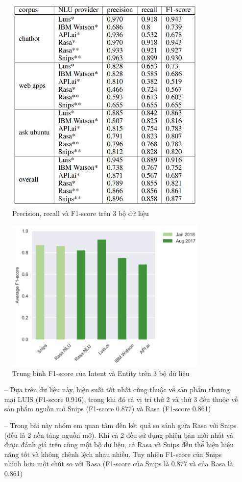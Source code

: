 \begin{figure}[htp]
    \centering
    \includegraphics[width=10cm]{images/comparisonimg/benchmark2017and2018.png}
    \caption{Precision, recall và F1-score trên 3 bộ dữ liệu}
    \label{fig:benchmark2017and2018}
\end{figure}

\begin{figure}[htp]
    \centering
    \includegraphics[width=10cm]{images/comparisonimg/averageF1-scores.png}
    \caption{Trung bình F1-score của Intent và Entity trên 3 bộ dữ liệu}
    \label{fig:averageF1-scores}
\end{figure}

\begin{itemize}
    \item[--] Dựa trên dữ liệu này, hiệu suất tốt nhất cũng thuộc về sản phẩm thương mại LUIS (F1-score 0.916), trong khi đó cả vị trí thứ 2 và thứ 3 đều thuộc về sản phẩm nguồn mở Snips (F1-score 0.877) và Rasa  (F1-score 0.861)
    \item[--] Trong bài này nhóm em quan tâm đến kết quả so sánh giữa Rasa với Snips (đều là 2 nền tảng nguồn mở). Khi cả 2 đều sử dụng phiên bản mới nhất và được đánh giá trên cùng một bộ dữ liệu, cả Rasa và Snips đều thể hiện hiệu năng tốt và không chênh lệch nhau nhiều. Tuy nhiên F1-score của Snips nhỉnh hơn một chút so với Rasa (F1-score của Snips là 0.877 và của Rasa là 0.861)
\end{itemize}

